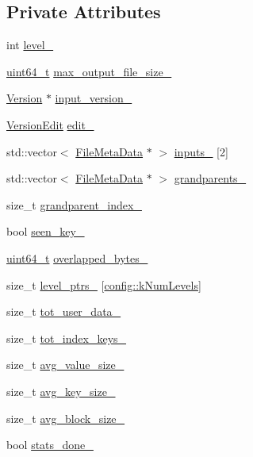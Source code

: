 \subsection*{Private Attributes}
\begin{DoxyCompactItemize}
\item 
int \hyperlink{classleveldb_1_1_compaction_a773153291660bb827362f2290dcc54c1}{level\+\_\+}
\item 
\hyperlink{stdint_8h_aaa5d1cd013383c889537491c3cfd9aad}{uint64\+\_\+t} \hyperlink{classleveldb_1_1_compaction_a15c8ad7b57cd233f1c712ad12aa65163}{max\+\_\+output\+\_\+file\+\_\+size\+\_\+}
\item 
\hyperlink{classleveldb_1_1_version}{Version} $\ast$ \hyperlink{classleveldb_1_1_compaction_a8671451e616a9553121d554c096f90ad}{input\+\_\+version\+\_\+}
\item 
\hyperlink{classleveldb_1_1_version_edit}{Version\+Edit} \hyperlink{classleveldb_1_1_compaction_a425d0ea6460c070e11711a8ca06c68fa}{edit\+\_\+}
\item 
std\+::vector$<$ \hyperlink{structleveldb_1_1_file_meta_data}{File\+Meta\+Data} $\ast$ $>$ \hyperlink{classleveldb_1_1_compaction_ae4134d8076b7b3657151e077c394acfc}{inputs\+\_\+} \mbox{[}2\mbox{]}
\item 
std\+::vector$<$ \hyperlink{structleveldb_1_1_file_meta_data}{File\+Meta\+Data} $\ast$ $>$ \hyperlink{classleveldb_1_1_compaction_a7b2b689910416375addbeeef11d4b01d}{grandparents\+\_\+}
\item 
size\+\_\+t \hyperlink{classleveldb_1_1_compaction_a852631569cc903b8b37f524a86a397e1}{grandparent\+\_\+index\+\_\+}
\item 
bool \hyperlink{classleveldb_1_1_compaction_adb523506dfa03c896a813d1248899da8}{seen\+\_\+key\+\_\+}
\item 
\hyperlink{stdint_8h_aaa5d1cd013383c889537491c3cfd9aad}{uint64\+\_\+t} \hyperlink{classleveldb_1_1_compaction_a6e3a86978f7bd228dbe06638a2c431f9}{overlapped\+\_\+bytes\+\_\+}
\item 
size\+\_\+t \hyperlink{classleveldb_1_1_compaction_a64265c8ae55ac34be8e81d9cb1ea22b5}{level\+\_\+ptrs\+\_\+} \mbox{[}\hyperlink{namespaceleveldb_1_1config_ab6017947ae68898c606643bddc0f5b9c}{config\+::k\+Num\+Levels}\mbox{]}
\item 
size\+\_\+t \hyperlink{classleveldb_1_1_compaction_a1608b09c74f5c330ac573368964e74e7}{tot\+\_\+user\+\_\+data\+\_\+}
\item 
size\+\_\+t \hyperlink{classleveldb_1_1_compaction_a7d801aaee909732013b2e1afc7719ac9}{tot\+\_\+index\+\_\+keys\+\_\+}
\item 
size\+\_\+t \hyperlink{classleveldb_1_1_compaction_a0605b229490c49f4c57f81b8e53face9}{avg\+\_\+value\+\_\+size\+\_\+}
\item 
size\+\_\+t \hyperlink{classleveldb_1_1_compaction_ae9d46ce87c93d6f795831f76518f807c}{avg\+\_\+key\+\_\+size\+\_\+}
\item 
size\+\_\+t \hyperlink{classleveldb_1_1_compaction_a4086b32abe03b987a230882f24fe923a}{avg\+\_\+block\+\_\+size\+\_\+}
\item 
bool \hyperlink{classleveldb_1_1_compaction_a3fa103d524d2c8056fed5e000169fde9}{stats\+\_\+done\+\_\+}
\end{DoxyCompactItemize}
